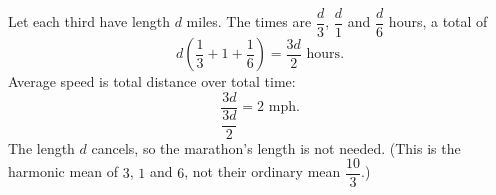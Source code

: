 Let each third have length $d$ miles. The times are $\dfrac {d}{3}$, $\dfrac {d}{1}$ and $\dfrac {d}{6}$ hours, a total of
\[
d\left(\dfrac{1}{3}+1+\dfrac{1}{6}\right)=\dfrac{3d}{2}\text{ hours}.
\]
Average speed is total distance over total time:
\[
\dfrac{3d}{\dfrac{3d}{2}}=\boxed{2}\text{ mph}.
\]
The length $d$ cancels, so the marathon's length is not needed. (This is the harmonic mean of $3$, $1$ and $6$, not their ordinary mean $\dfrac{10}{3}$.)
